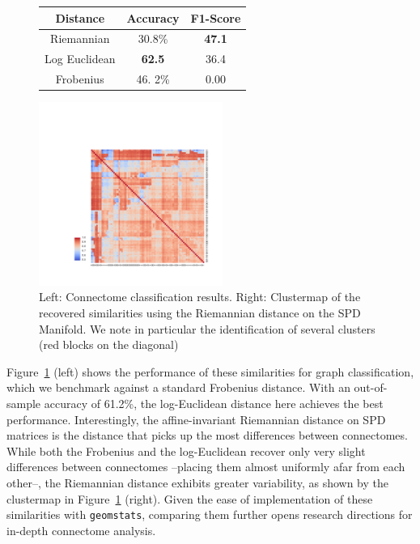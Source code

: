\documentclass{article}
\begin{document}
\begin{figure}
\vspace*{-5mm}
  \begin{minipage}[c]{0.45\linewidth}
    \centering
    \vspace*{-18mm}
    \begin{tabular}{|c|c|c|} \hline
       Distance & Accuracy & F1-Score \\ \hline \hline
       Riemannian & 30.8\% &\textbf{47.1}\\ \hline
       Log Euclidean & \textbf{62.5}  &36.4 \\ \hline
       Frobenius   &  46. 2\%   & 0.00 \\ \hline
    \end{tabular}
  \end{minipage}
\hfill
  \begin{minipage}[b]{0.45\linewidth}
    \includegraphics[width=6cm]{Images/distance_RD1.pdf}
      \end{minipage}
    \caption{Left: Connectome classification results. Right: Clustermap of the recovered similarities using the Riemannian distance on the SPD Manifold. We note in particular the identification of several clusters (red blocks on the diagonal)}
    \label{fig:SPD}
    \end{figure}

Figure~\ref{fig:SPD} (left) shows the performance of these similarities for graph classification, which we benchmark against a standard Frobenius distance. With an out-of-sample accuracy of 61.2\%, the log-Euclidean distance here achieves the best performance. Interestingly, the affine-invariant Riemannian distance on SPD matrices is the distance that picks up the most differences between connectomes. While both the Frobenius and the log-Euclidean recover only very slight differences between connectomes --placing them almost uniformly afar from each other--, the Riemannian distance exhibits greater variability, as shown by the clustermap in Figure~\ref{fig:SPD} (right). Given the ease of implementation of these similarities with \texttt{geomstats}, comparing them further opens research directions for in-depth connectome analysis.
\end{document}

